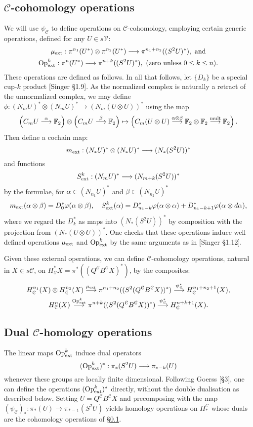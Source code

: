 \documentclass[11pt]{amsart}
\theoremstyle{plain}
\theoremstyle{definition}
\let\oldphi\phi
\let\phi\varphi
\renewcommand{\to}{\longrightarrow}
\newcommand{\calC}{\mathcal{C}}
\newcommand{\calV}{\mathcal{V}}
\theoremstyle{plain}
\newcommand{\ExtCohOp}{\textup{Op}_\textup{ext}}
\newcommand{\ExtCohProd}{\mu_\textup{ext}}
\newcommand{\F}{\mathbb{F}}
\begin{document}
\begin{Conventions and notation}
\subsection{$\calC$-cohomology operations}\label{generic coh ops section}
We will use $\psi_\calC$ to define operations on $\calC$-cohomology, employing certain generic operations, defined for any $U\in s\calV$:
\begin{gather*}
\ExtCohProd:\pi^{n_1}(U^*)\otimes \pi^{n_2}(U^*)\to \pi^{n_1+n_2}((S^2U)^*),\textup{ and}\\
\ExtCohOp^k:\pi^{n}(U^*)\to \pi^{n+k}((S^2U)^*),\textup{ (zero unless $0\leq k\leq n$).}
\end{gather*}
These operations are defined as follows. In all that follows, let $\{D_k\}$ be a special cup-$k$ product [Singer \S1.9]. As the normalized complex is naturally a retract of the unnormalized complex, we may define $\oldphi:\left(N_mU\right)^*\otimes \left(N_mU\right)^*\to \left(N_m(U\otimes U)\right)^*$ using the map
\[\left(C_mU\overset{\alpha}{\to}\F_2\right)\otimes \left(C_mU\overset{\beta}{\to}\F_2\right)\mapsto\left(C_m(U\otimes U)\overset{\alpha\otimes\beta}{\to}\F_2\otimes \F_2\overset{\textup{mult}}{\to}\F_2\right).\]
Then define a cochain map:
\[m_\textup{ext}:(N_*U)^*\otimes (N_*U)^*\to (N_*(S^2U))^*\]
and functions
\[S^k_\textup{ext}:(N_mU)^*\to (N_{m+k}(S^2U))^*\]
by the formulae, for $\alpha\in (N_{n_1}U)^*$ and $\beta\in (N_{n_2}U)^*$
\[m_\textup{ext}(\alpha\otimes\beta)=D_0^*\oldphi(\alpha\otimes\beta),\quad S^k_\textup{ext}(\alpha)=D^*_{n_1-k}\oldphi(\alpha\otimes \alpha)+D^*_{n_1-k+1}\oldphi(\alpha\otimes d\alpha),\]
where we regard the $D^*_k$ as maps into $(N_*(S^2U))^*$ by composition with the projection from $(N_*(U\otimes U))^*$. One checks that these operations induce well defined operations $\ExtCohProd$ and $\ExtCohOp^k$ by the same arguments as in [Singer \S1.12].

Given these external operations, we can define $\calC$-cohomology operations, natural in $X\in s\calC$, on $H^*_\calC X=\pi^*((Q^\calC B^\calC X)^*)$, by the composites:
\begin{gather*}
H_\calC^{n_1}(X)\otimes H_\calC^{n_2}(X)\overset{\ExtCohProd}{\to} \pi^{n_1+n_2}((S^2(Q^\calC B^\calC X))^*)\overset{\psi_\calC^*}{\to} H_\calC^{n_1+n_2+1}(X),\\
H_\calC^{n}(X)\overset{\ExtCohOp^k}{\to} \pi^{n+k}((S^2(Q^\calC B^\calC X))^*)\overset{\psi_\calC^*}{\to} H_\calC^{n+k+1}(X).
\end{gather*}
\subsection{Dual $\calC$-homology operations}
The linear maps $\ExtCohOp^k$ induce dual operators
\[(\ExtCohOp^k)^*:\pi_*(S^2U)\to \pi_{*-k}(U)\]
whenever these groups are locally finite dimensional. Following Goerss [\S3], one can define the operations $(\ExtCohOp^k)^*$ directly, without the double dualisation as described below. Setting $U=Q^{\calC}B^{\calC}X$ and precomposing with the map $(\psi_\calC)_*:\pi_*(U)\to\pi_{*-1}(S^2U)$ yields homology operations on $H_*^\calC$ whose duals are the cohomology operations of \S\ref{generic coh ops section}.


\end{Conventions and notation}
\end{document}
